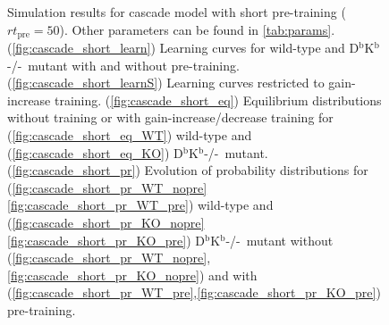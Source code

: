 \documentclass[12pt]{article}
\newcommand{\KO}{D$^\mathrm{b}$K$^\mathrm{b}$-/-}
\begin{document}
\begin{figure}
 \begin{center}
 \begin{myenuma}
  \item{}\label{fig:cascade_short_learn}
  \item{}\label{fig:cascade_short_learnS}
  \item\label{fig:cascade_short_eq}\begin{myenumi}
                    \item{}\label{fig:cascade_short_eq_WT}
                    \item{}\label{fig:cascade_short_eq_KO}
                  \end{myenumi}
  \item\label{fig:cascade_short_pr}\begin{myenumi}
                    \item{}\label{fig:cascade_short_pr_WT_nopre}
                    \item{}\label{fig:cascade_short_pr_WT_pre}
                    \item{}\label{fig:cascade_short_pr_KO_nopre}
                    \item{}\label{fig:cascade_short_pr_KO_pre}
                  \end{myenumi}
 \end{myenuma}
 \end{center}
  \caption{Simulation results for cascade model with short pre-training ($rt_\text{pre}=50$).
  Other parameters can be found in \autoref{tab:params}.
  (\ref{fig:cascade_short_learn}) Learning curves for wild-type and \KO\ mutant with and without pre-training.
  (\ref{fig:cascade_short_learnS}) Learning curves restricted to gain-increase training.
  (\ref{fig:cascade_short_eq}) Equilibrium distributions without training or with gain-increase/decrease training for (\ref{fig:cascade_short_eq_WT}) wild-type and (\ref{fig:cascade_short_eq_KO}) \KO\ mutant.
  (\ref{fig:cascade_short_pr}) Evolution of probability distributions for (\ref{fig:cascade_short_pr_WT_nopre}\ref{fig:cascade_short_pr_WT_pre}) wild-type and  (\ref{fig:cascade_short_pr_KO_nopre}\ref{fig:cascade_short_pr_KO_pre}) \KO\ mutant without (\ref{fig:cascade_short_pr_WT_nopre},\ref{fig:cascade_short_pr_KO_nopre}) and with (\ref{fig:cascade_short_pr_WT_pre},\ref{fig:cascade_short_pr_KO_pre}) pre-training. } \label{fig:cascade_short}
\end{figure}
\end{document}
